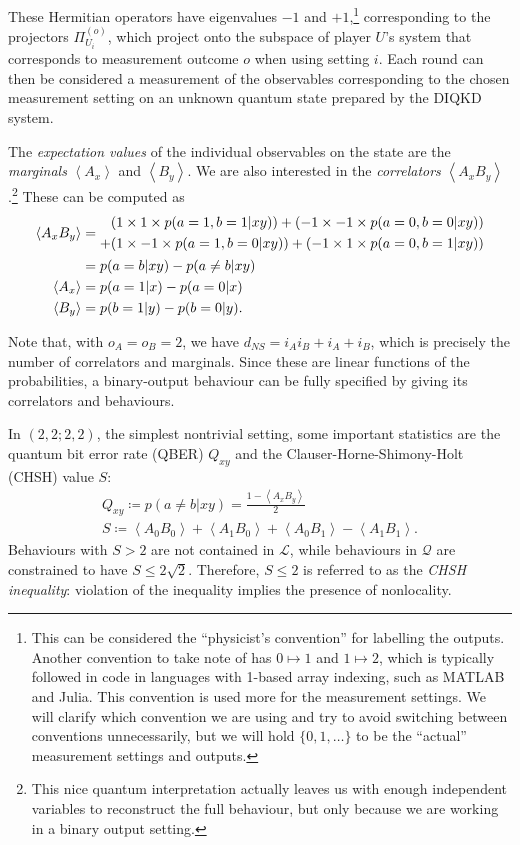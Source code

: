 \documentclass[10pt, a4paper]{article}
\numberwithin{equation}{section} %
\theoremstyle{definition}
\theoremstyle{plain}
\newcommand{\?}{\mathrel{?}} %
\newcommand{\angleb}[1]{\left\langle #1 \right\rangle} %
\newcommand{\Ls}{\mathcal{L}}
\newcommand{\Qs}{\mathcal{Q}}
\begin{document}
  These Hermitian operators have eigenvalues \(-1\) and \(+1\),\footnote{This can be considered the ``physicist's convention'' for labelling the outputs. Another convention to take note of has \(0 \mapsto 1\) and \(1 \mapsto 2\), which is typically followed in code in languages with 1-based array indexing, such as MATLAB and Julia. This convention is used more for the measurement settings. We will clarify which convention we are using and try to avoid switching between conventions unnecessarily, but we will hold \(\{0,1,\ldots\}\) to be the ``actual'' measurement settings and outputs.} corresponding to the projectors \(\Pi_{U_i}^{(o)}\), which project onto the subspace of player \(U\)'s system that corresponds to measurement outcome \(o\) when using setting \(i\). Each round can then be considered a measurement of the observables corresponding to the chosen measurement setting on an unknown quantum state prepared by the DIQKD system.

  The \emph{expectation values} of the individual observables on the state are the \emph{marginals} \(\angleb{A_x}\) and \(\angleb{B_y}\). We are also interested in the \emph{correlators} \(\angleb{A_x B_y}\).\footnote{This nice quantum interpretation actually leaves us with enough independent variables to reconstruct the full behaviour, but only because we are working in a binary output setting.} These can be computed as
  \begin{align}
    \angleb{A_x B_y} &= \begin{aligned}[c]
      (1 \times 1 \times p(a=1,b=1|xy)) + (-1 \times -1 \times p(a=0,b=0|xy)) \\
      + (1 \times -1 \times p(a=1,b=0|xy)) + (-1 \times 1 \times p(a=0,b=1|xy))
    \end{aligned} \notag \\
                     &= p(a=b|xy) - p(a\neq b|xy) \\
      \angleb{A_x} &= p(a=1|x) - p(a=0|x) \\
      \angleb{B_y} &= p(b=1|y) - p(b=0|y).
    \end{align}

    Note that, with \(o_A = o_B = 2\), we have \(d_{NS} = {i_A}{i_B} + i_A + i_B\), which is precisely the number of correlators and marginals. Since these are linear functions of the probabilities, a binary-output behaviour can be fully specified by giving its correlators and behaviours.

    In \((2,2;2,2)\), the simplest nontrivial setting, some important statistics are the quantum bit error rate (QBER) \(Q_{xy}\) and the Clauser-Horne-Shimony-Holt (CHSH) value \(S\):
    \begin{gather}
      Q_{xy} \coloneqq p(a \neq b|xy) = \frac{1-\angleb{A_x B_y}}{2} \\
      S \coloneqq \angleb{A_0 B_0} + \angleb{A_1 B_0} + \angleb{A_0 B_1} - \angleb{A_1 B_1}.
    \end{gather}
    Behaviours with \(S > 2\) are not contained in \(\Ls\), while behaviours in \(\Qs\) are constrained to have \(S \leq 2\sqrt{2}\). Therefore, \(S \leq 2\) is referred to as the \emph{CHSH inequality}: violation of the inequality implies the presence of nonlocality.
\end{document}
